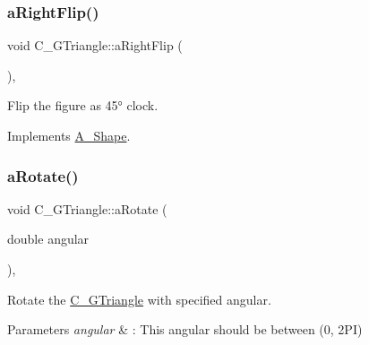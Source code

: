 \mbox{\label{classC__GTriangle_aa4f808a02ae18bd36c205a5d70eb3fef}} 
\subsubsection{\texorpdfstring{a\+Right\+Flip()}{aRightFlip()}\hspace{0.1cm}{\footnotesize\ttfamily [2/2]}}
{\footnotesize\ttfamily void C\+\_\+\+G\+Triangle\+::a\+Right\+Flip (\begin{DoxyParamCaption}{ }\end{DoxyParamCaption})\hspace{0.3cm}{\ttfamily [override]}, {\ttfamily [virtual]}}



Flip the figure as 45° clock. 



Implements \hyperlink{classA__Shape_a892688cbbad3297e00e87cce0dbfc76d}{A\+\_\+\+Shape}.

\mbox{\label{classC__GTriangle_a29c641aea4ef5fa4224b42dffc5fefa5}} 
\subsubsection{\texorpdfstring{a\+Rotate()}{aRotate()}\hspace{0.1cm}{\footnotesize\ttfamily [1/2]}}
{\footnotesize\ttfamily void C\+\_\+\+G\+Triangle\+::a\+Rotate (\begin{DoxyParamCaption}\item[{double}]{angular }\end{DoxyParamCaption})\hspace{0.3cm}{\ttfamily [override]}, {\ttfamily [virtual]}}



Rotate the \hyperlink{classC__GTriangle}{C\+\_\+\+G\+Triangle} with specified angular. 


\begin{DoxyParams}{Parameters}
{\em angular} & \+: This angular should be between (0, 2\+PI) \\
\hline
\end{DoxyParams}


